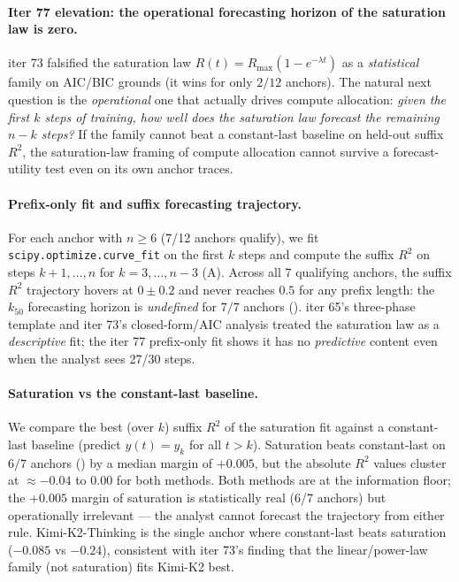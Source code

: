 \paragraph{Iter 77 elevation: the operational forecasting horizon of the saturation law is zero.}
\label{par:scaling-iter77}
iter 73 falsified the saturation law $R(t) = R_\mathrm{max}(1 - e^{-\lambda t})$ as a
\emph{statistical} family on AIC/BIC grounds (it wins for only $2/12$ anchors).
The natural next question is the \emph{operational} one that actually drives
compute allocation: \emph{given the first $k$ steps of training, how well does
the saturation law forecast the remaining $n-k$ steps?}  If the family cannot
beat a constant-last baseline on held-out suffix $R^2$, the saturation-law
framing of compute allocation cannot survive a forecast-utility test even on
its own anchor traces.

\paragraph{Prefix-only fit and suffix forecasting trajectory.}
\label{par:scaling-iter77-prefix}
For each anchor with $n \geq 6$ (7/12 anchors qualify), we fit
\texttt{scipy.optimize.curve\_fit} on the first $k$ steps and compute the
suffix $R^2$ on steps $k+1,\ldots,n$ for $k = 3,\ldots,n-3$
(A).  Across all 7 qualifying anchors, the
suffix $R^2$ trajectory hovers at $0 \pm 0.2$ and never reaches
$0.5$ for any prefix length: the $k_{50}$ forecasting horizon is
\emph{undefined} for $7/7$ anchors
().  iter 65's three-phase template and
iter 73's closed-form/AIC analysis treated the saturation law as a
\emph{descriptive} fit; the iter 77 prefix-only fit shows it has no
\emph{predictive} content even when the analyst sees 27/30 steps.

\paragraph{Saturation vs the constant-last baseline.}
\label{par:scaling-iter77-baseline}
We compare the best (over $k$) suffix $R^2$ of the saturation fit against a
constant-last baseline (predict $y(t) = y_k$ for all $t > k$).
Saturation beats constant-last on $6/7$ anchors ()
by a median margin of $+0.005$, but the absolute $R^2$ values cluster at
$\approx -0.04$ to $0.00$ for both methods.  Both methods are at the
information floor; the $+0.005$ margin of saturation is statistically real
(6/7 anchors) but operationally irrelevant --- the analyst cannot forecast
the trajectory from either rule.  Kimi-K2-Thinking is the single anchor
where constant-last beats saturation ($-0.085$ vs $-0.24$), consistent
with iter 73's finding that the linear/power-law family (not saturation)
fits Kimi-K2 best.

